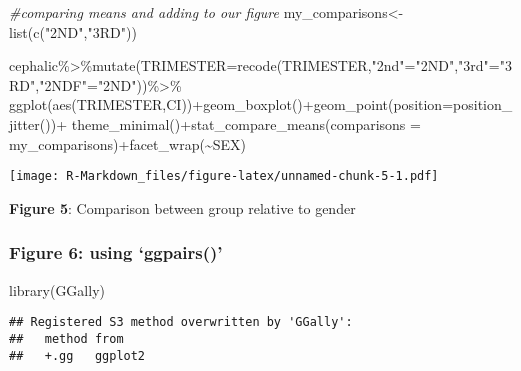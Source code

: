 \documentclass[
]{article}
\newenvironment{Shaded}{\begin{snugshade}}{\end{snugshade}}
\newcommand{\AttributeTok}[1]{\textcolor[rgb]{0.77,0.63,0.00}{#1}}
\newcommand{\CommentTok}[1]{\textcolor[rgb]{0.56,0.35,0.01}{\textit{#1}}}
\newcommand{\FunctionTok}[1]{\textcolor[rgb]{0.00,0.00,0.00}{#1}}
\newcommand{\NormalTok}[1]{#1}
\newcommand{\OtherTok}[1]{\textcolor[rgb]{0.56,0.35,0.01}{#1}}
\newcommand{\SpecialCharTok}[1]{\textcolor[rgb]{0.00,0.00,0.00}{#1}}
\newcommand{\StringTok}[1]{\textcolor[rgb]{0.31,0.60,0.02}{#1}}
\begin{document}
\begin{Shaded}
\begin{Highlighting}[]
\CommentTok{\#comparing means and adding to our figure}
\NormalTok{my\_comparisons}\OtherTok{\textless{}{-}}\FunctionTok{list}\NormalTok{(}\FunctionTok{c}\NormalTok{(}\StringTok{"2ND"}\NormalTok{,}\StringTok{"3RD"}\NormalTok{))}

\NormalTok{cephalic}\SpecialCharTok{\%\textgreater{}\%}\FunctionTok{mutate}\NormalTok{(}\AttributeTok{TRIMESTER=}\FunctionTok{recode}\NormalTok{(TRIMESTER,}\StringTok{"2nd"}\OtherTok{=}\StringTok{"2ND"}\NormalTok{,}\StringTok{"3rd"}\OtherTok{=}\StringTok{"3RD"}\NormalTok{,}\StringTok{"2NDF"}\OtherTok{=}\StringTok{"2ND"}\NormalTok{))}\SpecialCharTok{\%\textgreater{}\%}
  \FunctionTok{ggplot}\NormalTok{(}\FunctionTok{aes}\NormalTok{(TRIMESTER,CI))}\SpecialCharTok{+}\FunctionTok{geom\_boxplot}\NormalTok{()}\SpecialCharTok{+}\FunctionTok{geom\_point}\NormalTok{(}\AttributeTok{position=}\FunctionTok{position\_jitter}\NormalTok{())}\SpecialCharTok{+}
  \FunctionTok{theme\_minimal}\NormalTok{()}\SpecialCharTok{+}\FunctionTok{stat\_compare\_means}\NormalTok{(}\AttributeTok{comparisons =}\NormalTok{ my\_comparisons)}\SpecialCharTok{+}\FunctionTok{facet\_wrap}\NormalTok{(}\SpecialCharTok{\textasciitilde{}}\NormalTok{SEX)}
\end{Highlighting}
\end{Shaded}

\texttt{[image: R-Markdown\_files/figure-latex/unnamed-chunk-5-1.pdf]}

\textbf{Figure 5}: Comparison between group relative to gender

\hypertarget{figure-6-using-ggpairs}{%
\subsubsection{\texorpdfstring{\textbf{Figure 6}: using
`ggpairs()'}{Figure 6: using `ggpairs()'}}\label{figure-6-using-ggpairs}}

\begin{Shaded}
\begin{Highlighting}[]
\FunctionTok{library}\NormalTok{(GGally)}
\end{Highlighting}
\end{Shaded}

\begin{verbatim}
## Registered S3 method overwritten by 'GGally':
##   method from   
##   +.gg   ggplot2
\end{verbatim}
\end{document}
